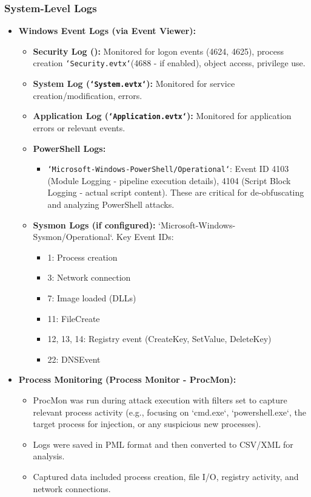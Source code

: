 \documentclass[11pt]{article}
\begin{document}
				\subsubsection{System-Level Logs}
				\begin{itemize}
					\item \textbf{Windows Event Logs (via Event Viewer):}
					\begin{itemize}
						\item \textbf{Security Log ():} Monitored for logon events (4624, 4625), process creation \texttt{`Security.evtx`}(4688 - if enabled), object access, privilege use.
						\item \textbf{System Log (\texttt{`System.evtx`}):} Monitored for service creation/modification, errors.
						\item \textbf{Application Log (\texttt{`Application.evtx`}):} Monitored for application errors or relevant events.
						\item \textbf{PowerShell Logs:}
						\begin{itemize}[label=$\circ$]
							\item \texttt{`Microsoft-Windows-PowerShell/Operational`}: Event ID 4103 (Module Logging - pipeline execution details), 4104 (Script Block Logging - actual script content). These are critical for de-obfuscating and analyzing PowerShell attacks.
						\end{itemize}
						\item \textbf{Sysmon Logs (if configured):} `Microsoft-Windows-Sysmon/Operational`. Key Event IDs:
						\begin{itemize}[label=$\circ$]
							\item 1: Process creation
							\item 3: Network connection
							\item 7: Image loaded (DLLs)
							\item 11: FileCreate
							\item 12, 13, 14: Registry event (CreateKey, SetValue, DeleteKey)
							\item 22: DNSEvent
						\end{itemize}
					\end{itemize}
					\item \textbf{Process Monitoring (Process Monitor - ProcMon):}
					\begin{itemize}
						\item ProcMon was run during attack execution with filters set to capture relevant process activity (e.g., focusing on `cmd.exe`, `powershell.exe`, the target process for injection, or any suspicious new processes).
						\item Logs were saved in PML format and then converted to CSV/XML for analysis.
						\item Captured data included process creation, file I/O, registry activity, and network connections.
					\end{itemize}
				\end{itemize}
				
\end{document}
